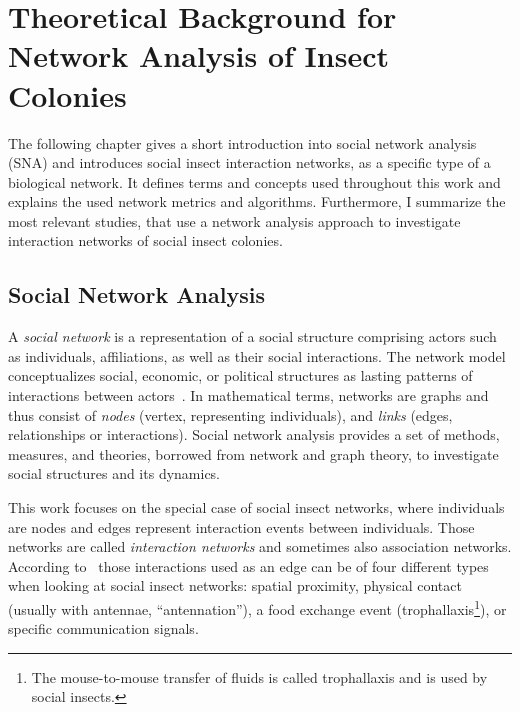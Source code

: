 \chapter{Theoretical Background for Network Analysis of Insect Colonies}
The following chapter gives a short introduction into social network analysis (SNA) and introduces social insect interaction networks, as a specific type of a biological network. It defines terms and concepts used throughout this work and explains the used network metrics and algorithms.
Furthermore, I summarize the most relevant studies, that use a network analysis approach to investigate interaction networks of social insect colonies.
\section{Social Network Analysis}
\label{ch:bg}

A \emph{social network} is a representation of a social structure comprising actors such as individuals, affiliations, as well as their social interactions.
The network model conceptualizes social, economic, or political structures as lasting patterns of interactions between actors~\cite{wasserman1994social}.
In mathematical terms, networks are graphs and thus consist of \emph{nodes} (vertex, representing individuals), and \emph{links} (edges, relationships or interactions).
Social network analysis provides a set of methods, measures, and theories, borrowed from network and graph theory, to investigate social structures and its dynamics.

This work focuses on the special case of social insect networks, where individuals are nodes and edges represent interaction events between individuals. Those networks are called \emph{interaction networks} and sometimes also association networks.
According to~\textcite{charbonneau2013social} those interactions used as an edge can be of four different types when looking at social insect networks: spatial proximity, physical contact (usually with antennae, ``antennation''), a food exchange event (trophallaxis\footnote{The mouse-to-mouse transfer of fluids is called trophallaxis and is used by social insects.}), or specific communication signals.

